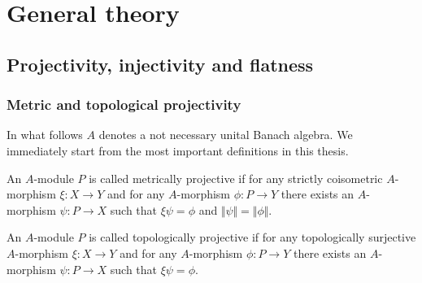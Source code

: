 
\chapter{General theory} %

\label{ChapterGeneralTheory} %



\section{Projectivity, injectivity and flatness}
\label{SectionProjectivityInjectivityAndFlatness}



\subsection{Metric and topological projectivity}
\label{SubSectionMetricAndTopologicalProjectivity}

In what follows $A$ denotes a not necessary unital Banach algebra. We immediately start from the most important definitions in this thesis.

\begin{definition}\label{MetProjMod} An $A$-module $P$ is called metrically projective if for any strictly coisometric $A$-morphism $\xi:X\to Y$ and for any $A$-morphism $\phi:P\to Y$ there exists an $A$-morphism $\psi:P\to X$ such that $\xi\psi=\phi$  and $\Vert\psi\Vert=\Vert\phi\Vert$.
\end{definition}

\begin{definition}\label{TopProjMod} An $A$-module $P$ is called  topologically projective if for any topologically surjective $A$-morphism $\xi:X\to Y$ and for any $A$-morphism $\phi:P\to Y$ there exists an $A$-morphism $\psi:P\to X$ such that $\xi\psi=\phi$.
\end{definition}

